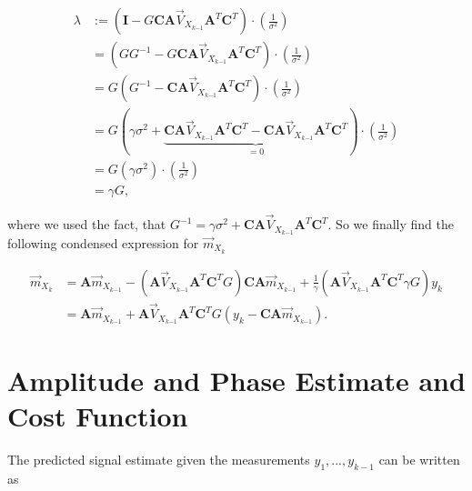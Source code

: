 \documentclass[11pt,a4paper,twoside]{report}
\newcommand{\messF}[3]{\overrightarrow{#1}_{{#2}_{k{#3}}}}
\newcommand{\mat}[1]{\mathbf{#1}}
\begin{document}
\begin{align}
	\label{eq: lambda factor}
	\lambda &:= \left(\mat{I} - G\mat{C}\mat{A}\messF{V}{X}{-1}\mat{A}^T\mat{C}^T\right) \cdot \left(\frac{1}{\sigma^2}\right) \\
	&= \left(GG^{-1} - G\mat{C}\mat{A}\messF{V}{X}{-1}\mat{A}^T\mat{C}^T\right) \cdot \left(\frac{1}{\sigma^2}\right) \\
	&= G\left(G^{-1} - \mat{C}\mat{A}\messF{V}{X}{-1}\mat{A}^T\mat{C}^T\right) \cdot \left(\frac{1}{\sigma^2}\right) \\
	&= G\left(\gamma \sigma^2 + \underbrace{\mat{C} \mat{A}\messF{V}{X}{-1} \mat{A}^T\mat{C}^T - \mat{C}\mat{A}\messF{V}{X}{-1}\mat{A}^T\mat{C}^T}_{=0}\right) \cdot \left(\frac{1}{\sigma^2}\right) \\
	&= G\left(\gamma \sigma^2 \right) \cdot \left(\frac{1}{\sigma^2}\right) \\
	&= \gamma G,
\end{align}

where we used the fact, that $G^{-1} = \gamma \sigma^2 + \mat{C} \mat{A}\messF{V}{X}{-1} \mat{A}^T\mat{C}^T$. So we finally find the following condensed expression for $\messF{m}{X}{}$

\begin{align}
	\label{eq: update rule, mean vector}
	\messF{m}{X}{} &= \mat{A} \messF{m}{X}{-1} - \left(\mat{A}\messF{V}{X}{-1}\mat{A}^T \mat{C}^T G\right)\mat{C}\mat{A}\messF{m}{X}{-1} + \frac{1}{\gamma} \left(\mat{A}\messF{V}{X}{-1}\mat{A}^T\mat{C}^T \gamma G\right) y_k \\
	&= \mat{A} \messF{m}{X}{-1} + \mat{A}\messF{V}{X}{-1}\mat{A}^T\mat{C}^T G \left( y_k - \mat{C}\mat{A}\messF{m}{X}{-1} \right).
\end{align}

%


\chapter{Amplitude and Phase Estimate and Cost Function}
The predicted signal estimate given the measurements ${y_1,...,y_{k-1}}$ can be written as
\end{document}
